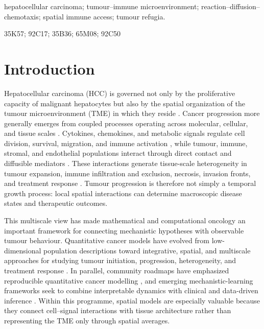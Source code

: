 \documentclass[]{interact}
\theoremstyle{plain}%
\theoremstyle{definition}
\theoremstyle{remark}
\begin{document}
\begin{keywords}
hepatocellular carcinoma; tumour--immune microenvironment; reaction--diffusion--chemotaxis; spatial immune access; tumour refugia.
\end{keywords}

\begin{amscode}
35K57; 92C17; 35B36; 65M08; 92C50
\end{amscode}

\section{Introduction}\label{sec:introduction}

Hepatocellular carcinoma (HCC) is governed not only by the proliferative
capacity of malignant hepatocytes but also by the spatial organization of the tumour microenvironment (TME) in which they reside
\cite{bray2024global,llovet2022immunotherapies,bruni2020immune}. Cancer
progression more generally emerges from coupled processes operating across
molecular, cellular, and tissue scales
\cite{beeghly2023measuring,desoyer2025computational}. Cytokines, chemokines, and metabolic signals regulate cell division, survival, migration, and immune activation \cite{tiwari2025molecular}, while tumour, immune, stromal, and endothelial populations interact through direct contact and diffusible mediators \cite{kaminska2015role,joshi2026dynamic,he2022extracellular}. These interactions generate tissue-scale heterogeneity in tumour expansion, immune infiltration and exclusion, necrosis, invasion fronts, and treatment response \cite{giuliani2025immune,liang2026separation,biswas2022inference}. Tumour progression is therefore not simply a temporal growth process: local spatial interactions can determine macroscopic disease states and therapeutic outcomes.

This multiscale view has made mathematical and computational oncology an important framework for connecting mechanistic hypotheses with observable tumour behaviour. Quantitative cancer models have evolved from low-dimensional population descriptions toward integrative, spatial, and multiscale approaches for studying tumour initiation, progression, heterogeneity, and treatment response
\cite{anderson2008integrative,altrock2015mathematics,yu2026microscopic,mcdonald2023computational,gopukumar2026multiscale}. In parallel, community roadmaps have emphasized reproducible quantitative cancer modelling \cite{rockne20192019,wang2025multi}, and emerging mechanistic-learning
frameworks seek to combine interpretable dynamics with clinical and data-driven
inference \cite{metzcar2024review,lan2025shallow,liu2025bidirectional,de2025radiation,laslo2025mechanistic}. Within this programme, spatial models are especially valuable because they connect cell--signal interactions with tissue architecture rather than representing the TME only through spatial averages.
\end{document}
